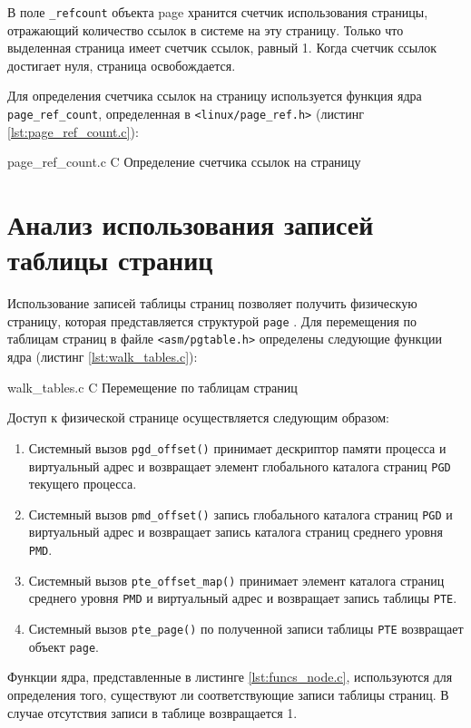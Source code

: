 В поле \texttt{\_refcount} объекта page хранится счетчик использования страницы, отражающий количество ссылок в системе на эту страницу. Только что выделенная страница имеет счетчик ссылок, равный 1. Когда счетчик ссылок достигает нуля, страница освобождается.

Для определения счетчика ссылок на страницу используется функция ядра \texttt{page\_ref\_count}, определенная в \texttt{<linux/page\_ref.h>} (листинг \ref{lst:page_ref_count.c}):

    {page_ref_count.c}
    {C}
    {Определение счетчика ссылок на страницу}
    
\section{Анализ использования записей таблицы страниц}

Использование записей таблицы страниц позволяет получить физическую страницу, которая представляется структурой \texttt{page} \cite{tables}. Для перемещения по таблицам страниц в файле \texttt{<asm/pgtable.h>} определены следующие функции ядра (листинг \ref{lst:walk_tables.c}):

    {walk_tables.c}
    {C}
    {Перемещение по таблицам страниц}
    
Доступ к физической странице осуществляется следующим образом:

\begin{enumerate}
	\item Системный вызов \texttt{pgd\_offset()} принимает дескриптор памяти процесса и виртуальный адрес и возвращает элемент глобального каталога страниц \texttt{PGD} текущего процесса.
	\item Системный вызов \texttt{pmd\_offset()} запись глобального каталога страниц \texttt{PGD} и виртуальный адрес и возвращает запись каталога страниц среднего уровня \texttt{PMD}.
	\item Системный вызов \texttt{pte\_offset\_map()} принимает элемент каталога страниц среднего уровня \texttt{PMD} и виртуальный адрес и возвращает запись таблицы \texttt{PTE}.
	\item Системный вызов \texttt{pte\_page()} по полученной записи таблицы \texttt{PTE} возвращает объект \texttt{page}.
\end{enumerate}

Функции ядра, представленные в листинге \ref{lst:funcs_node.c}, используются для определения того, существуют ли соответствующие записи таблицы страниц. В случае отсутствия записи в таблице возвращается 1.
    
